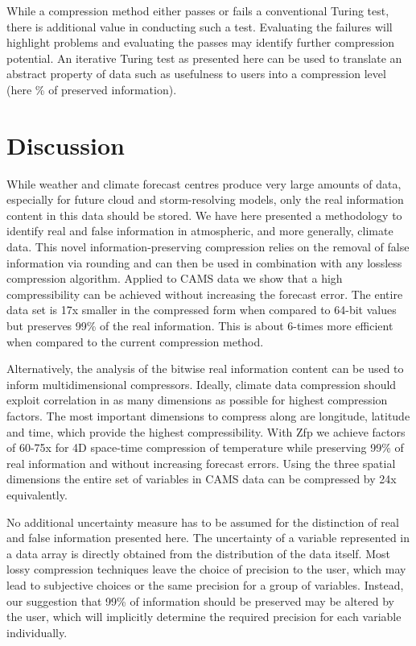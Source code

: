 While a compression method either passes or fails a conventional Turing test, there is additional value in conducting such a test.
Evaluating the failures will highlight problems and evaluating the passes may identify further compression potential. An iterative Turing test
as presented here can be used to translate an abstract property of data such as usefulness to users into a compression level (here \% of
preserved information).

\section{Discussion}
\label{sec:compression_discussion}

While weather and climate forecast centres produce very large amounts of data, especially for future cloud and storm-resolving models,
only the real information content in this data should be stored. We have here presented a methodology to identify real and false information
in atmospheric, and more generally, climate data. This novel information-preserving compression relies on the removal of false information
via rounding and can then be used in combination with any lossless compression algorithm. Applied to CAMS data we show that a high
compressibility can be achieved without increasing the forecast error. The entire data set is 17x smaller in the compressed form when
compared to 64-bit values but preserves 99\% of the real information. This is about 6-times more efficient when compared to the
current compression method.

Alternatively, the analysis of the bitwise real information content can be used to inform multidimensional compressors. Ideally, climate data
compression should exploit correlation in as many dimensions as possible for highest compression factors. The most important dimensions
to compress along are longitude, latitude and time, which provide the highest compressibility. With Zfp we achieve factors of 60-75x for
4D space-time compression of temperature while preserving 99\% of real information and without increasing forecast errors. Using the three
spatial dimensions the entire set of variables in CAMS data can be compressed by 24x equivalently.

No additional uncertainty measure has to be assumed for the distinction of real and false information presented here. The uncertainty of a variable
represented in a data array is directly obtained from the distribution of the data itself. Most lossy compression techniques leave the choice of
precision to the user, which may lead to subjective choices or the same precision for a group of variables. Instead, our suggestion that
99\% of information should be preserved may be altered by the user, which will implicitly determine the required precision for each variable individually. 

